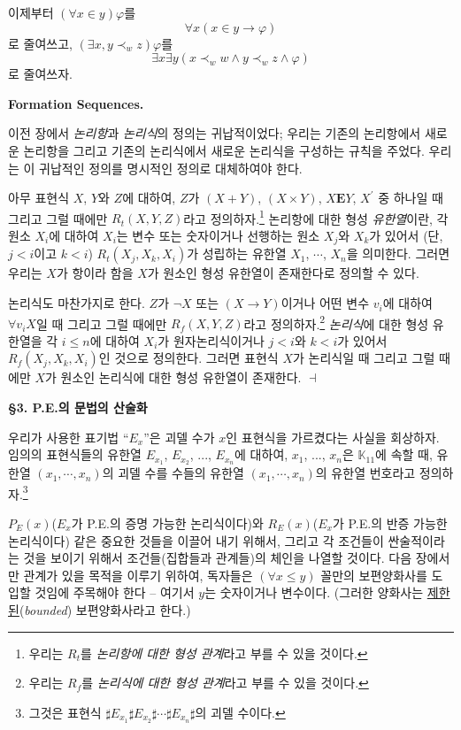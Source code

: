 \documentclass[12pt]{paper}
\newenvironment{context}[1][]
{ \noindent \textbf{{#1}.}
}
{ \hfill $ \dashv $ }
\begin{document}
이제부터 $ \left( \forall x \in y \right) \varphi $를 $$ \forall x \left( x \in y \rightarrow \varphi \right) $$로 줄여쓰고,
$ \left( \exists x , y \prec_{w} z \right) \varphi$를 $$ \exists x \exists y \left( x \prec_{w} w \land y \prec_{w} z \land \varphi \right) $$로 줄여쓰자.

\begin{context}[Formation Sequences]
이전 장에서 \textit{논리항}과 \textit{논리식}의 정의는 귀납적이었다;
우리는 기존의 논리항에서 새로운 논리항을 그리고 기존의 논리식에서 새로운 논리식을 구성하는 규칙을 주었다.
우리는 이 귀납적인 정의를 명시적인 정의로 대체하여야 한다.

아무 표현식 $X$, $Y$와 $Z$에 대하여,
$Z$가 $\left( X + Y \right)$, $\left( X \times Y \right)$, $X \mathbf{E} Y$, $X^{\prime}$ 중 하나일 때 그리고 그럴 때에만
$R_t \left( X , Y , Z \right)$라고 정의하자.\footnote
{
우리는 $R_t$를 \textit{논리항에 대한 형성 관계}라고 부를 수 있을 것이다.
}
논리항에 대한 형성 \textit{유한열}이란, 각 원소 $X_{i}$에 대하여 $X_{i}$는 변수 또는 숫자이거나 선행하는 원소 $X_{j}$와 $X_{k}$가 있어서 (단, $j < i$이고 $k < i$) $R_t \left( X_{j}, X_{k}, X_{i} \right)$가 성립하는 유한열 $X_1$, $\cdots$, $X_n$을 의미한다.
그러면 우리는 $X$가 항이라 함을 $X$가 원소인 형성 유한열이 존재한다로 정의할 수 있다.

논리식도 마찬가지로 한다. $Z$가 $\lnot X$ 또는 $\left( X \to Y \right)$이거나 어떤 변수 $v_{i}$에 대하여 $\forall v_{i} X$일 때 그리고 그럴 때에만
$R_f \left( X , Y , Z \right)$라고 정의하자.\footnote
{
우리는 $R_f$를 \textit{논리식에 대한 형성 관계}라고 부를 수 있을 것이다.
}
\textit{논리식}에 대한 형성 유한열을 각 $i \le n$에 대하여 $X_{i}$가 원자논리식이거나 $j < i$와 $k < i$가 있어서 $R_f \left( X_{j} , X_{k} , X_{i} \right)$인 것으로 정의한다.
그러면 표현식 $X$가 논리식일 때 그리고 그럴 때에만 $X$가 원소인 논리식에 대한 형성 유한열이 존재한다.
\end{context}

\noindent \textbf{\S3. P.E.의 문법의 산술화}

우리가 사용한 표기법 ``$E_{x}$''은 괴델 수가 $x$인 표현식을 가르켰다는 사실을 회상하자.
임의의 표현식들의 유한열 $E_{x_1}$, $E_{x_2}$, ..., $E_{x_n}$에 대하여, $x_1$, ..., $x_n$은 $\mathbb{K}_{11}$에 속할 때,
유한열 $\left( x_{1}, \cdots, x_{n} \right)$의 괴델 수를 수들의 유한열 $\left( x_{1}, \cdots, x_{n} \right)$의 유한열 번호라고 정의하자.\footnote
{
그것은 표현식 $\sharp E_{x_1} \sharp E_{x_2} \sharp \cdots \sharp E_{x_n} \sharp$의 괴델 수이다.
}

$P_E \left( x \right)$($E_x$가 P.E.의 증명 가능한 논리식이다)와 $R_E \left( x \right)$($E_x$가 P.E.의 반증 가능한 논리식이다) 같은 중요한 것들을 이끌어 내기 위해서,
그리고 각 조건들이 싼술적이라는 것을 보이기 위해서 조건들(집합들과 관계들)의 체인을 나열할 것이다.
다음 장에서만 관계가 있을 목적을 이루기 위하여, 독자들은 $\left( \forall x \le y \right)$ 꼴만의 보편양화사를 도입할 것임에 주목해야 한다 -- 여기서 $y$는 숫자이거나 변수이다. (그러한 양화사는 \underline{제한된}(\textit{bounded}) 보편양화사라고 한다.)
\end{document}
